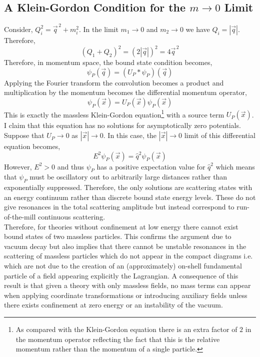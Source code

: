 \documentclass[12pt]{article}
\begin{document}
\subsection{A Klein-Gordon Condition for the $m \to 0$ Limit}
Consider, $Q_i^2 = \vec{q}^{\, 2} + m_i^2$. In the limit $m_1 \to 0$ and $m_2 \to 0$ we have $Q_i = |\vec{q}|$. Therefore,
\begin{equation}
(Q_1 + Q_2)^2 = (2 |\vec{q}|)^2 = 4 \vec{q}^{\, 2}
\end{equation}
Therefore, in momentum space, the bound state condition becomes,
\begin{equation}
[E^2 - 4 \vec{q}^{\, 2}] \psi_P(\vec{q}) = (U_P * \psi_P)(\vec{q}) 
\end{equation}
Applying the Fourier transform the convolution becomes a product and multiplication by the momentum becomes the differential momentum operator,
\begin{equation}
[E^2 - 4 \hat{q}^2 ] \psi_P(\vec{x}) = U_P(\vec{x}) \psi_P(\vec{x})
\end{equation}
This is exactly the massless Klein-Gordon equation\footnote{As compared with the Klein-Gordon equation there is an extra factor of $2$ in the momentum operator reflecting the fact that this is the relative momentum rather than the momentum of a single particle.} with a source term $U_P(\vec{x})$. 
\bigskip\\
I claim that this equation has no solutions for asymptotically zero potentials. Suppose that $U_P \to 0$ as $|\vec{x}| \to 0$. In this case, the $|\vec{x}| \to 0$ limit of this differential equation becomes,
\begin{equation}
E^2 \psi_P(\vec{x}) = \hat{q}^2 \psi_P(\vec{x})
\end{equation}
However, $E^2 > 0$ and thus $\psi_P$ has a positive expectation value for $\hat{q}^2$ which means that $\psi_P$ must be oscillatory out to arbitrarily large distances rather than exponentially suppressed. Therefore, the only solutions are scattering states with an energy continuum rather than discrete bound state energy levels. These do not give resonances in the total scattering amplitude but instead correspond to run-of-the-mill continuous scattering. 
\bigskip\\
Therefore, for theories without confinement at low energy there cannot exist bound states of two massless particles. This confirms the argument due to vacuum decay but also implies that there cannot be unstable resonances in the scattering of massless particles which do not appear in the compact diagrams i.e. which are not due to the creation of an (approximately) on-shell fundamental particle of a field appearing explicitly the Lagrangian. A consequence of this result is that given a theory with only massless fields, no mass terms can appear when applying coordinate transformations or introducing auxiliary fields unless there exists confinement at zero energy or an instability of the vacuum.     
\end{document}
